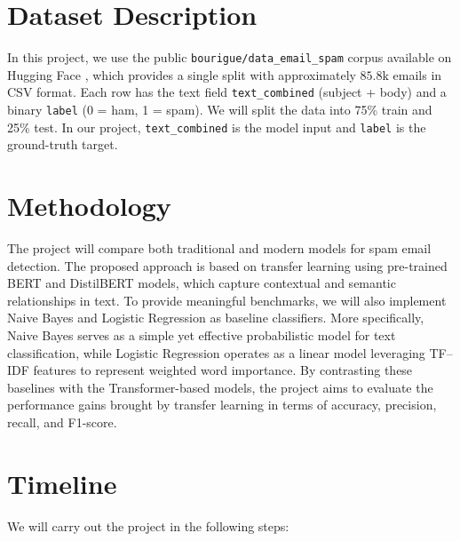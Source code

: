 \documentclass[12pt]{article}
\begin{document}
\section{Dataset Description}
In this project, we use the public \texttt{bourigue/data\_email\_spam} corpus available on Hugging Face \cite{huggingface_dataset}, which provides a single split with approximately $ 85.8\text{k}$ emails in CSV format. Each row has the text field \texttt{text\_combined} (subject + body) and a binary \texttt{label} (0 = ham, 1 = spam). We will split the data into 75\% train and 25\% test. In our project, \texttt{text\_combined} is the model input and \texttt{label} is the ground-truth target.

\section{ Methodology}
The project will compare both traditional and modern models for spam email detection. The proposed approach is based on transfer learning using pre-trained BERT and DistilBERT models, which capture contextual and semantic relationships in text. To provide meaningful benchmarks, we will also implement Naive Bayes and Logistic Regression as baseline classifiers. More specifically, Naive Bayes serves as a simple yet effective probabilistic model for text classification, while Logistic Regression operates as a linear model leveraging TF–IDF features to represent weighted word importance. By contrasting these baselines with the Transformer-based models, the project aims to evaluate the performance gains brought by transfer learning in terms of accuracy, precision, recall, and F1-score.


\section{Timeline}
We will carry out the project in the following steps:
\end{document}
